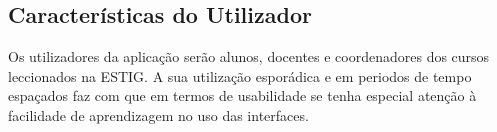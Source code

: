 \subsection{Características do Utilizador}
Os utilizadores da aplicação serão alunos, docentes e coordenadores dos cursos leccionados na ESTIG. A sua utilização esporádica e em periodos de tempo espaçados faz com que em termos de usabilidade se tenha especial atenção à facilidade de aprendizagem no uso das interfaces.
